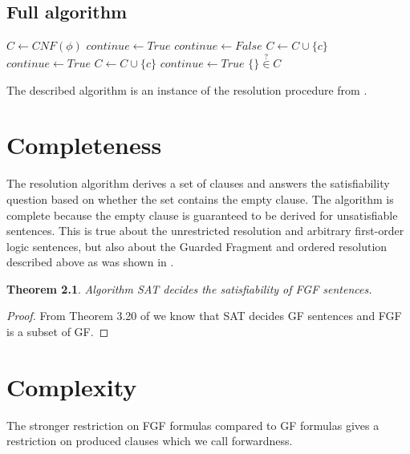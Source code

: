 \documentclass[english, shortabstract]{iithesis}
\theoremstyle{definition} \newtheorem{definition}{Definition}[chapter]
\theoremstyle{remark} \newtheorem{remark}[definition]{Observation}
\theoremstyle{plain} \newtheorem{theorem}[definition]{Theorem}
\theoremstyle{plain} \newtheorem{lemma}[definition]{Lemma}
\begin{document}
\section{Full algorithm}

\begin{algorithm}\label{alg:sat}
\begin{algorithmic}
\State $C \gets CNF(\phi)$
\State $continue \gets True$
\State $continue \gets False$
    \State $C \gets C \cup \{c\}$
    \State $continue \gets True$
\EndIf
{}
    \State $C \gets C \cup \{c\}$
    \State $continue \gets True$
\EndIf
\EndFor
\EndWhile
\State
\Return $\{\} \stackrel{?}{\in} C$
\EndProcedure
\end{algorithmic}
\end{algorithm}

The described algorithm is an instance of the resolution procedure from \cite{nivelle}.

\chapter{Completeness}

The resolution algorithm derives a set of clauses and answers the satisfiability question 
based on whether the set contains the empty clause. The algorithm is complete because 
the empty clause is guaranteed to be derived for unsatisfiable sentences.
This is true about the unrestricted resolution and arbitrary first-order logic sentences, 
but also about the Guarded Fragment and ordered resolution described above as was shown in \cite{nivelle}.

\begin{theorem}
Algorithm SAT decides the satisfiability of FGF sentences.
\end{theorem}

\begin{proof}
From Theorem 3.20 of \cite{nivelle} we know that SAT decides GF sentences and FGF is a subset of GF.
\end{proof}

\chapter{Complexity}

The stronger restriction on FGF formulas compared to GF formulas gives a restriction on produced clauses which we call forwardness.
\end{document}
